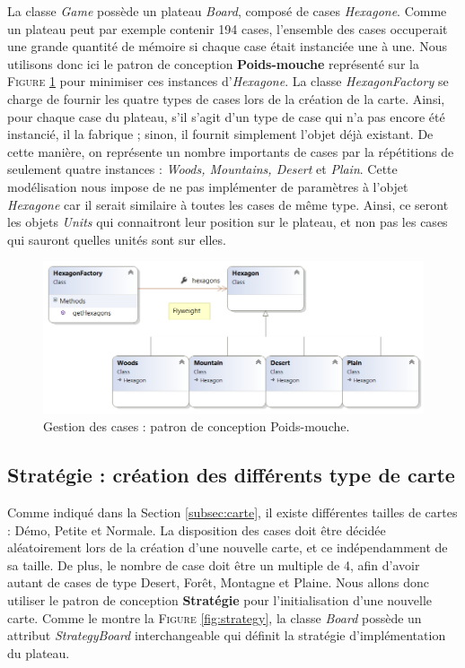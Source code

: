 		La classe \emph{Game} possède un plateau \emph{Board}, composé de cases \emph{Hexagone}. Comme un plateau peut par exemple contenir 194 cases, l'ensemble des cases occuperait une grande quantité de mémoire si chaque case était instanciée une à une. Nous utilisons donc ici le patron de conception \textbf{Poids-mouche} représenté sur la \textsc{Figure} \ref{fig:flyweight} pour minimiser ces instances d'\emph{Hexagone}. La classe \emph{HexagonFactory} se charge de fournir les quatre types de cases lors de la création de la carte. Ainsi, pour chaque case du plateau, s'il s'agit d'un type de case qui n'a pas encore été instancié, il la fabrique ; sinon, il fournit simplement l'objet déjà existant. De cette manière, on représente un nombre importants de cases par la répétitions de seulement quatre instances : \emph{Woods, Mountains, Desert} et \emph{Plain}. Cette modélisation nous impose de ne pas implémenter de paramètres à l'objet \emph{Hexagone} car il serait similaire à toutes les cases de même type. Ainsi, ce seront les objets \emph{Units} qui connaitront leur position sur le plateau, et non pas les cases qui sauront quelles unités sont sur elles.

		\begin{figure}
			\begin{center}
				\includegraphics[width=1\textwidth]{figure/flyweight.png}
			\end{center}
			\caption{Gestion des cases : patron de conception Poids-mouche.}
			\label{fig:flyweight}
		\end{figure}


	\subsection{Stratégie : création des différents type de carte}

		Comme indiqué dans la Section \ref{subsec:carte}, il existe différentes tailles de cartes : Démo, Petite et Normale. La disposition des cases doit être décidée aléatoirement lors de la création d'une nouvelle carte, et ce indépendamment de sa taille.  De plus, le nombre de case doit être un multiple de 4, afin d'avoir autant de cases de type Desert, Forêt, Montagne et Plaine. Nous allons donc utiliser le patron de conception \textbf{Stratégie} pour l'initialisation d'une nouvelle carte. Comme le montre la \textsc{Figure} \ref{fig:strategy}, la classe \emph{Board} possède un attribut \emph{StrategyBoard} interchangeable qui définit la stratégie d'implémentation du plateau. 
		
